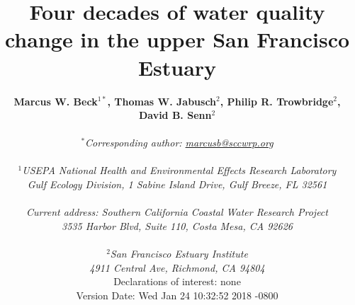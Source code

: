 \documentclass[letterpaper,12pt,oneside]{article}\usepackage[]{graphicx}\usepackage[]{color}
\begin{document}
\raggedbottom
\linenumbers
\raggedright
{}
\setlength{\parindent}{0.5in}
\renewcommand\refname{References \vspace{12pt}}

\begin{singlespace}
\title{{\bf {\Large Four decades of water quality change in the upper San Francisco Estuary}}}
\author{
  {\bf {\normalsize Marcus W. Beck$^{1*}$, Thomas W. Jabusch$^2$, Philip R. Trowbridge$^2$, David B. Senn$^2$}}
  \\\\{\textit {\normalsize $^*$Corresponding author: \href{mailto:marcusb@sccwrp.org}{marcusb@sccwrp.org}}}
  \\\\{\textit {\normalsize $^1$USEPA National Health and Environmental Effects Research Laboratory}}
  \\{\textit {\normalsize Gulf Ecology Division, 1 Sabine Island Drive, Gulf Breeze, FL 32561}}
  \\\\{\textit {\normalsize Current address: Southern California Coastal Water Research Project}}
  \\{\textit {\normalsize 3535 Harbor Blvd, Suite 110, Costa Mesa, CA 92626}}
  \\\\{\textit {\normalsize $^2$San Francisco Estuary Institute}}
	\\{\textit {\normalsize 4911 Central Ave, Richmond, CA 94804}}
  \vspace{1in}
  \\{Declarations of interest: none}
  \vspace{0.1in}
  \\ Version Date:   Wed Jan 24 10:32:52 2018 -0800
	}
\date{}
\maketitle
\end{singlespace}
\clearpage
\end{document}
